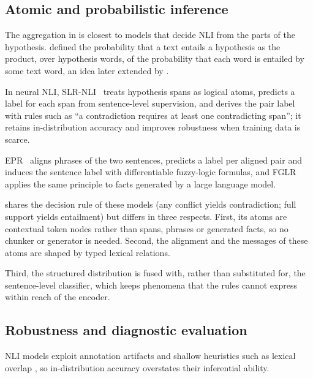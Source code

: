 \subsection{Atomic and probabilistic inference}
\label{sec:rw-atomic}

The aggregation in \model{} is closest to models that decide NLI from the parts of the hypothesis.
\citet{glickman2005probabilistic} defined the probability that a text entails a hypothesis as the product,
over hypothesis words, of the probability that each word is entailed by some text word, an idea later
extended by \citet{shnarch2011probabilistic}.

In neural NLI, SLR-NLI~\citep{stacey2022logical} treats
hypothesis spans as logical atoms, predicts a label for each span from sentence-level supervision, and
derives the pair label with rules such as ``a contradiction requires at least one contradicting span'';
it retains in-distribution accuracy and improves robustness when training data is scarce.

EPR~\citep{wu2023weakly} aligns phrases of the two sentences, predicts a label per aligned pair and
induces the sentence label with differentiable fuzzy-logic formulas, and FGLR~\citep{stacey2024atomic}
applies the same principle to facts generated by a large language model.

\model{} shares the decision rule of these models (any conflict yields contradiction; full support
yields entailment) but differs in three respects. First, its atoms are contextual token nodes rather than
spans, phrases or generated facts, so no chunker or generator is needed. Second, the alignment and the
messages of these atoms are shaped by typed lexical relations.

Third, the structured distribution is fused with, rather than substituted for, the sentence-level
classifier, which keeps phenomena that the rules cannot express within reach of the encoder.

\subsection{Robustness and diagnostic evaluation}
\label{sec:rw-robustness}

NLI models exploit annotation artifacts \citep{gururangan2018annotation} and shallow heuristics such as
lexical overlap \citep{mccoy2019right}, so in-distribution accuracy overstates their inferential ability.

